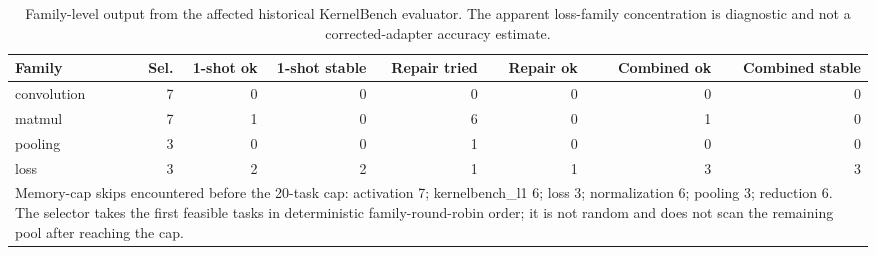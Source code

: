 \begin{table}[htbp]
\centering
\caption{Family-level output from the affected historical KernelBench evaluator. The apparent loss-family concentration is diagnostic and not a corrected-adapter accuracy estimate.}
\label{tab:kernelbench-family-summary}
\scriptsize
\begin{tabularx}{\linewidth}{l r r r r r r r}
\toprule
Family & Sel. & 1-shot ok & 1-shot stable & Repair tried & Repair ok & Combined ok & Combined stable \\
\midrule
convolution & 7 & 0 & 0 & 0 & 0 & 0 & 0 \\
matmul & 7 & 1 & 0 & 6 & 0 & 1 & 0 \\
pooling & 3 & 0 & 0 & 1 & 0 & 0 & 0 \\
loss & 3 & 2 & 2 & 1 & 1 & 3 & 3 \\
\midrule
\multicolumn{8}{p{0.92\linewidth}}{Memory-cap skips encountered before the 20-task cap: activation 7; kernelbench\_l1 6; loss 3; normalization 6; pooling 3; reduction 6. The selector takes the first feasible tasks in deterministic family-round-robin order; it is not random and does not scan the remaining pool after reaching the cap.} \\
\bottomrule
\end{tabularx}
\end{table}
